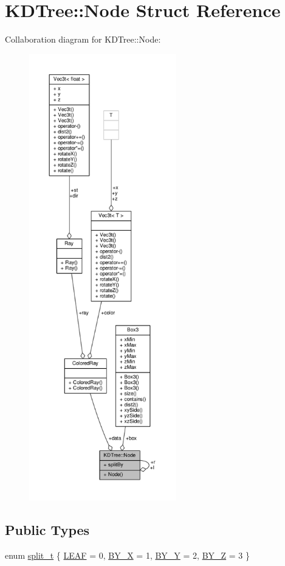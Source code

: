 \hypertarget{structKDTree_1_1Node}{}\section{K\+D\+Tree\+:\+:Node Struct Reference}
\label{structKDTree_1_1Node}


Collaboration diagram for K\+D\+Tree\+:\+:Node\+:
\nopagebreak
\begin{figure}[H]
\begin{center}
\leavevmode
\includegraphics[height=550pt]{structKDTree_1_1Node__coll__graph}
\end{center}
\end{figure}
\subsection*{Public Types}
\begin{DoxyCompactItemize}
\item 
enum \hyperlink{structKDTree_1_1Node_ab21ae38de8fe0e25d29d0ae136a1db34}{split\+\_\+t} \{ \hyperlink{structKDTree_1_1Node_ab21ae38de8fe0e25d29d0ae136a1db34ae9e20517e320a257a7ec3aecb69427ec}{L\+E\+AF} = 0, 
\hyperlink{structKDTree_1_1Node_ab21ae38de8fe0e25d29d0ae136a1db34a36069e5e459835d23e1e4e2412f15f15}{B\+Y\+\_\+X} = 1, 
\hyperlink{structKDTree_1_1Node_ab21ae38de8fe0e25d29d0ae136a1db34a16bcf65fb5fef5f33c18e6de9022fd2d}{B\+Y\+\_\+Y} = 2, 
\hyperlink{structKDTree_1_1Node_ab21ae38de8fe0e25d29d0ae136a1db34a921306d44eb973ea0dffcff75817a095}{B\+Y\+\_\+Z} = 3
 \}
\end{DoxyCompactItemize}
